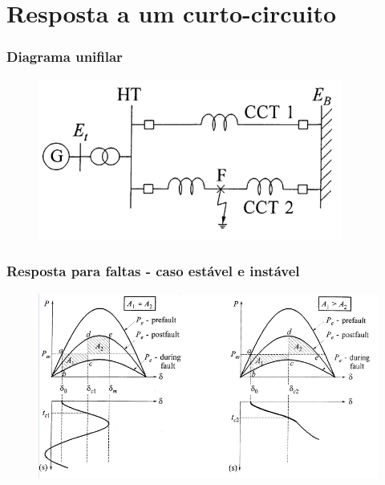 \section{Resposta a um curto-circuito}
\begin{frame}
\frametitle{Diagrama unifilar}
\begin{figure}[h!]
\begin{center}
    \includegraphics[width=10cm]{imagens/maq6.png}  
\end{center}
\label{maq6} 
\end{figure}
\end{frame}

\begin{frame}
\frametitle{Resposta para faltas - caso estável e instável}
\begin{figure}[h!]
\begin{center}
    \includegraphics[width=12cm]{imagens/maq10.png}  
\end{center}
\label{maq10} 
\end{figure}
\end{frame}




